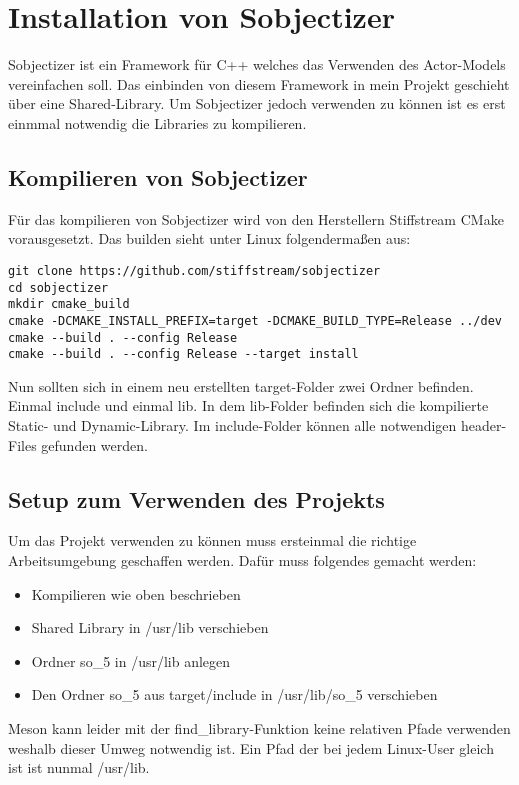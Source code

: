 \chapter{Installation von Sobjectizer}

\vspace{10mm}

Sobjectizer ist ein Framework für C++ welches das Verwenden des Actor-Models vereinfachen soll.
Das einbinden von diesem Framework in mein Projekt geschieht über eine Shared-Library.
Um Sobjectizer jedoch verwenden zu können ist es erst einmmal notwendig die Libraries zu kompilieren.

\section{Kompilieren von Sobjectizer}
Für das kompilieren von Sobjectizer wird von den Herstellern Stiffstream CMake vorausgesetzt.
Das builden sieht unter Linux folgendermaßen aus:

\begin{verbatim}
git clone https://github.com/stiffstream/sobjectizer
cd sobjectizer
mkdir cmake_build
cmake -DCMAKE_INSTALL_PREFIX=target -DCMAKE_BUILD_TYPE=Release ../dev
cmake --build . --config Release
cmake --build . --config Release --target install
\end{verbatim}

Nun sollten sich in einem neu erstellten target-Folder zwei Ordner befinden. Einmal include und einmal
lib. In dem lib-Folder befinden sich die kompilierte Static- und Dynamic-Library. Im include-Folder können
alle notwendigen header-Files gefunden werden.

\newpage

\section{Setup zum Verwenden des Projekts}
Um das Projekt verwenden zu können muss ersteinmal die richtige Arbeitsumgebung geschaffen werden.
Dafür muss folgendes gemacht werden:

\begin{itemize}
  \item Kompilieren wie oben beschrieben
  \item Shared Library in /usr/lib verschieben
  \item Ordner so\_5 in /usr/lib anlegen
  \item Den Ordner so\_5 aus target/include in /usr/lib/so\_5 verschieben
\end{itemize}

Meson kann leider mit der find\_library-Funktion keine relativen Pfade verwenden weshalb dieser Umweg notwendig
ist. Ein Pfad der bei jedem Linux-User gleich ist ist nunmal /usr/lib.

